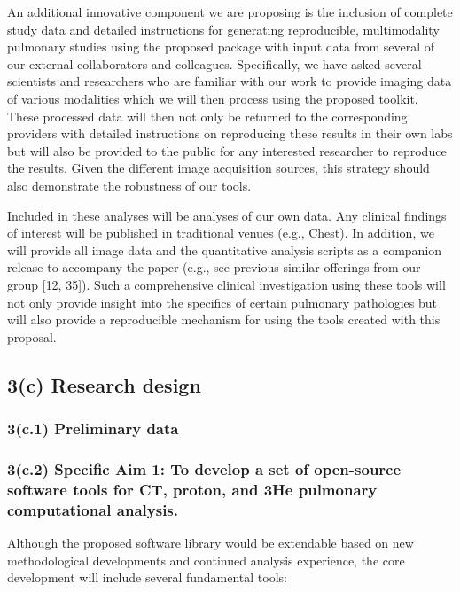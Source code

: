 \documentclass[11pt,]{article}
\begin{document}
An additional innovative component we are proposing is the inclusion of
complete study data and detailed instructions for generating
reproducible, multimodality pulmonary studies using the proposed package
with input data from several of our external collaborators and
colleagues. Specifically, we have asked several scientists and
researchers who are familiar with our work to provide imaging data of
various modalities which we will then process using the proposed
toolkit. These processed data will then not only be returned to the
corresponding providers with detailed instructions on reproducing these
results in their own labs but will also be provided to the public for
any interested researcher to reproduce the results. Given the different
image acquisition sources, this strategy should also demonstrate the
robustness of our tools.

Included in these analyses will be analyses of our own data. Any
clinical findings of interest will be published in traditional venues
(e.g., Chest). In addition, we will provide all image data and the
quantitative analysis scripts as a companion release to accompany the
paper (e.g., see previous similar offerings from our group {[}12,
35{]}). Such a comprehensive clinical investigation using these tools
will not only provide insight into the specifics of certain pulmonary
pathologies but will also provide a reproducible mechanism for using the
tools created with this proposal.

\subsection{\textbf{3(c) Research design}}\label{c-research-design}

\subsubsection{3(c.1) Preliminary data}\label{c.1-preliminary-data}

\subsubsection{3(c.2) Specific Aim 1: To develop a set of open-source
software tools for CT, proton, and 3He pulmonary computational
analysis.}\label{c.2-specific-aim-1-to-develop-a-set-of-open-source-software-tools-for-ct-proton-and-3he-pulmonary-computational-analysis.}

Although the proposed software library would be extendable based on new
methodological developments and continued analysis experience, the core
development will include several fundamental tools:
\end{document}
